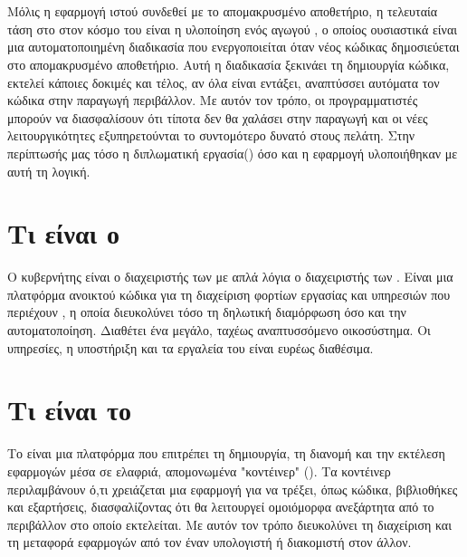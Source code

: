 \section{ }
Μόλις η εφαρμογή ιστού συνδεθεί με το απομακρυσμένο αποθετήριο, η τελευταία τάση στο
στον κόσμο του  είναι η υλοποίηση ενός αγωγού , ο οποίος ουσιαστικά
είναι μια αυτοματοποιημένη διαδικασία που ενεργοποιείται όταν νέος κώδικας δημοσιεύεται στο
απομακρυσμένο αποθετήριο. Αυτή η διαδικασία ξεκινάει τη δημιουργία κώδικα, εκτελεί κάποιες δοκιμές και
τέλος, αν όλα είναι εντάξει, αναπτύσσει αυτόματα τον κώδικα στην παραγωγή
περιβάλλον. Με αυτόν τον τρόπο, οι προγραμματιστές μπορούν να διασφαλίσουν ότι τίποτα δεν θα χαλάσει
στην παραγωγή και οι νέες λειτουργικότητες εξυπηρετούνται το συντομότερο δυνατό στους
πελάτη. Στην περίπτωσής μας τόσο η διπλωματική εργασία() όσο και η εφαρμογή υλοποιήθηκαν με αυτή τη λογική.


\section{Τι είναι ο  }
Ο κυβερνήτης είναι ο διαχειριστής των με απλά λόγια ο διαχειριστής των . Είναι μια 
πλατφόρμα ανοικτού κώδικα για τη διαχείριση φορτίων εργασίας και υπηρεσιών που περιέχουν 
, η οποία διευκολύνει τόσο τη δηλωτική διαμόρφωση όσο και την αυτοματοποίηση. 
Διαθέτει ένα μεγάλο, ταχέως αναπτυσσόμενο οικοσύστημα. Οι υπηρεσίες, η υποστήριξη και τα εργαλεία του  είναι ευρέως διαθέσιμα.

\section{Τι είναι το  }
Το  είναι μια πλατφόρμα που επιτρέπει τη δημιουργία, τη διανομή και την εκτέλεση εφαρμογών μέσα σε ελαφριά, απομονωμένα "κοντέινερ" (). 
Τα κοντέινερ περιλαμβάνουν ό,τι χρειάζεται μια εφαρμογή για να τρέξει, όπως κώδικα, βιβλιοθήκες και εξαρτήσεις, διασφαλίζοντας ότι θα λειτουργεί ομοιόμορφα 
ανεξάρτητα από το περιβάλλον στο οποίο εκτελείται. Με αυτόν τον τρόπο διευκολύνει τη διαχείριση και τη μεταφορά εφαρμογών από τον έναν υπολογιστή ή διακομιστή 
στον άλλον.

